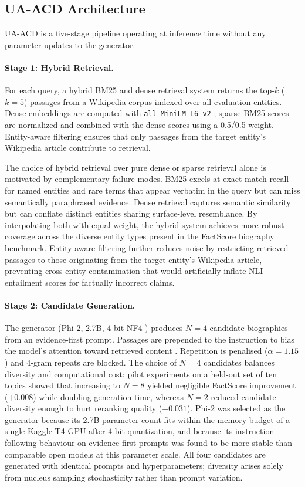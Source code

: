 \documentclass[11pt]{article}
\begin{document}
\subsection{UA-ACD Architecture}
UA-ACD is a five-stage pipeline operating at inference time without any parameter updates to the generator.

\paragraph{Stage 1: Hybrid Retrieval.}
For each query, a hybrid BM25 \citep{robertson2009bm25} and dense retrieval system returns the top-$k$ ($k{=}5$) passages from a Wikipedia corpus indexed over all evaluation entities. Dense embeddings are computed with \texttt{all-MiniLM-L6-v2} \citep{reimers2019sentencebert}; sparse BM25 scores are normalized and combined with the dense scores using a 0.5/0.5 weight. Entity-aware filtering ensures that only passages from the target entity's Wikipedia article contribute to retrieval.

The choice of hybrid retrieval over pure dense or sparse retrieval alone is motivated by complementary failure modes. BM25 excels at exact-match recall for named entities and rare terms that appear verbatim in the query but can miss semantically paraphrased evidence. Dense retrieval captures semantic similarity but can conflate distinct entities sharing surface-level resemblance. By interpolating both with equal weight, the hybrid system achieves more robust coverage across the diverse entity types present in the FactScore biography benchmark. Entity-aware filtering further reduces noise by restricting retrieved passages to those originating from the target entity's Wikipedia article, preventing cross-entity contamination that would artificially inflate NLI entailment scores for factually incorrect claims.

\paragraph{Stage 2: Candidate Generation.}
The generator (Phi-2, 2.7B, 4-bit NF4 \cite{dettmers2023qlora}) produces $N=4$ candidate biographies from an evidence-first prompt. Passages are prepended to the instruction to bias the model's attention toward retrieved content \citep{shi2023trusting}. Repetition is penalised ($\alpha=1.15$) and 4-gram repeats are blocked. The choice of $N=4$ candidates balances diversity and computational cost: pilot experiments on a held-out set of ten topics showed that increasing to $N=8$ yielded negligible FactScore improvement ($+0.008$) while doubling generation time, whereas $N=2$ reduced candidate diversity enough to hurt reranking quality ($-0.031$). Phi-2 was selected as the generator because its 2.7B parameter count fits within the memory budget of a single Kaggle T4 GPU after 4-bit quantization, and because its instruction-following behaviour on evidence-first prompts was found to be more stable than comparable open models at this parameter scale. All four candidates are generated with identical prompts and hyperparameters; diversity arises solely from nucleus sampling stochasticity rather than prompt variation.
\end{document}
